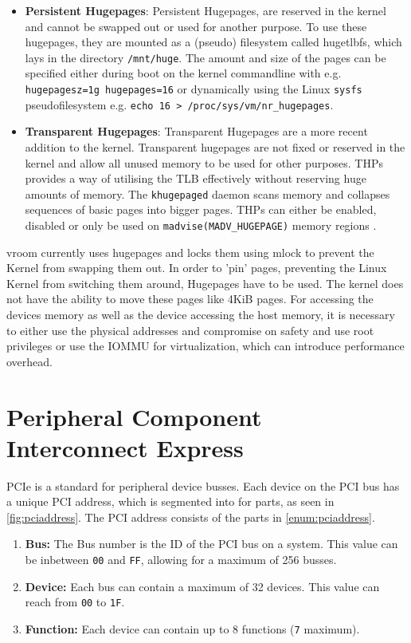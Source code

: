 \begin{itemize}
    \item \textbf{Persistent Hugepages}: Persistent Hugepages, are reserved in the kernel and cannot be swapped out or used for another purpose. To use these hugepages, they are mounted as a (pseudo) filesystem called hugetlbfs, which lays in the directory \texttt{/mnt/huge}. The amount and size of the pages can be specified either during boot on the kernel commandline with e.g. \texttt{hugepagesz=1g hugepages=16} or dynamically using the Linux \texttt{sysfs} pseudofilesystem e.g. \texttt{echo 16 > /proc/sys/vm/nr\_hugepages}\cite{hugetlbkerneldocs}.
    \item \textbf{Transparent Hugepages}: Transparent Hugepages are a more recent addition to the kernel. Transparent hugepages are not fixed or reserved in the kernel and allow all unused memory to be used for other purposes. THPs provides a way of utilising the TLB effectively without reserving huge amounts of memory. The \texttt{khugepaged} daemon scans memory and collapses sequences of basic pages into bigger pages. THPs can either be enabled, disabled or only be used on \texttt{madvise(MADV\_HUGEPAGE)} memory regions \cite{transhugekerneldocs}.
\end{itemize}

vroom currently uses hugepages and locks them using mlock to prevent the Kernel from swapping them out. In order to 'pin' pages, preventing the Linux Kernel from switching them around, Hugepages have to be used. The kernel does not have the ability to move these pages like 4KiB pages.
For accessing the devices memory as well as the device accessing the host memory, it is necessary to either use the physical addresses and compromise on safety and use root privileges or use the IOMMU for virtualization, which can introduce performance overhead.

\section{Peripheral Component Interconnect Express}
PCIe is a standard for peripheral device busses. Each device on the PCI bus has a unique PCI address, which is segmented into for parts, as seen in \autoref{fig:pciaddress}. The PCI address consists of the parts in \autoref{enum:pciaddress}.

\begin{enumerate} \label{enum:pciaddress}
    \item \textbf{Bus: } The Bus number is the ID of the PCI bus on a system. This value can be inbetween \texttt{00} and \texttt{FF}, allowing for a maximum of 256 busses.
    \item \textbf{Device: } Each bus can contain a maximum of 32 devices. This value can reach from \texttt{00} to \texttt{1F}.
    \item \textbf{Function: } Each device can contain up to 8 functions (\texttt{7} maximum).
\end{enumerate}

